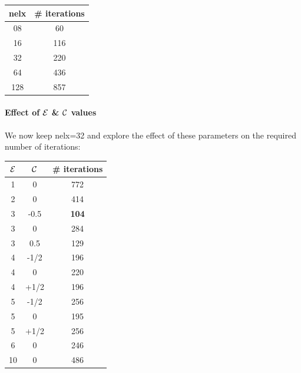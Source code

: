 \begin{center}
\begin{tabular}{cc}
\hline
nelx & \# iterations \\
\hline
08 &60  \\
16 &116 \\
32 &220 \\
64 &436 \\
128 & 857 \\
\hline
\end{tabular}
\end{center}

\paragraph{Effect of ${\cal E}$ \& ${\cal C}$ values} 
We now keep nelx=32 and explore the effect of these parameters on the 
required number of iterations:

\begin{center}
\begin{tabular}{ccc}
\hline
${\cal E}$ & ${\cal C}$ & \# iterations \\
\hline
1& 0 & 772 \\
2& 0 & 414 \\
3& -0.5 & {\bf 104} \\
3& 0    & 284 \\
3& 0.5 & 129 \\
4&-1/2& 196 \\
4&0   & 220 \\
4&+1/2& 196 \\
5& -1/2 & 256 \\
5& 0 & 195 \\
5& +1/2 & 256 \\
6& 0 & 246 \\
10& 0 & 486 \\
\hline
\end{tabular}
\end{center}

